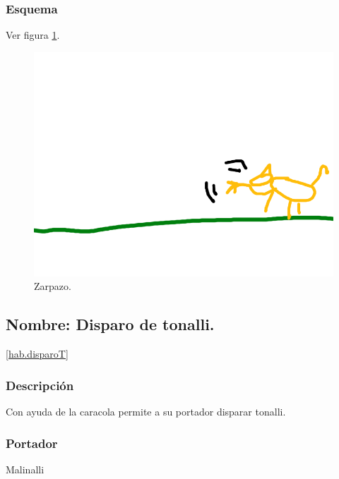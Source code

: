 \documentclass[11pt,letterpaper]{article}
\begin{document}
			\subsubsection{Esquema}
			Ver figura \ref{fig:zarpazo}.
			\begin{figure}
				\centering
				\includegraphics[height=0.2 \textheight]{Imagenes/zarpazo}
				\caption{Zarpazo.}
				\label{fig:zarpazo}
			\end{figure}
\subsection{Nombre: Disparo de tonalli.}\ref{hab.disparoT}
\subsubsection{Descripción}
Con ayuda de la caracola permite a su portador disparar tonalli.
\subsubsection{Portador}
Malinalli
\end{document}
